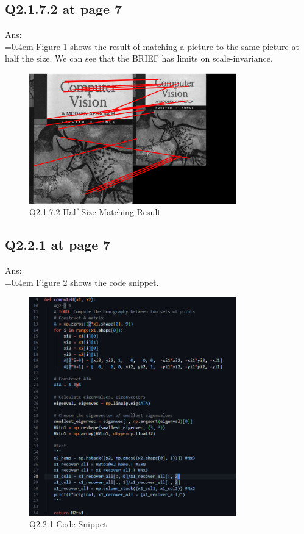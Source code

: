 \documentclass{article}
\begin{document}
	\newpage
	\subsection*{Q2.1.7.2 at page 7}
	Ans:\\
	\hangindent=0.4em \hspace{0.3em} Figure \ref{fig:Q2172_hsr} shows the result of matching a picture to the same picture at half the size. We can see that the BRIEF has limits on scale-invariance.
	\begin{figure}[H]		
		\centering
		\includegraphics[width=0.8\textwidth]{Q4_2_1_7_2_match_result_half_size.png}  %
		\caption{Q2.1.7.2 Half Size Matching Result}
		\label{fig:Q2172_hsr}
	\end{figure}		
	
	
	\newpage
	\subsection*{Q2.2.1 at page 7}
	Ans:\\
	\hangindent=0.4em \hspace{0.3em} Figure \ref{fig:Q221_cns} shows the code snippet.
	\begin{figure}[H]		
		\centering
		\includegraphics[width=0.8\textwidth]{Q2_2_1.png}  %
		\caption{Q2.2.1 Code Snippet}
		\label{fig:Q221_cns}
	\end{figure}
	
\end{document}
